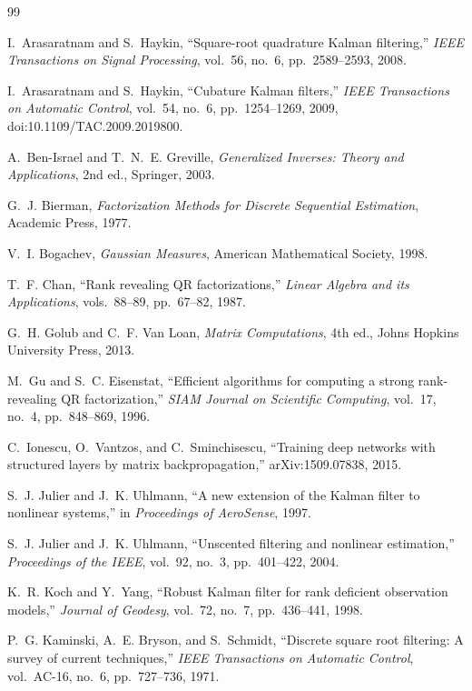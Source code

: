 \documentclass[11pt]{article}
\begin{document}
\begin{thebibliography}{99}

I.~Arasaratnam and S.~Haykin, ``Square-root quadrature Kalman filtering,''
\emph{IEEE Transactions on Signal Processing}, vol.~56, no.~6, pp.~2589--2593,
2008.

I.~Arasaratnam and S.~Haykin, ``Cubature Kalman filters,''
\emph{IEEE Transactions on Automatic Control}, vol.~54, no.~6, pp.~1254--1269,
2009, doi:10.1109/TAC.2009.2019800.

A.~Ben-Israel and T.~N.~E. Greville, \emph{Generalized Inverses: Theory and
Applications}, 2nd ed., Springer, 2003.

G.~J. Bierman, \emph{Factorization Methods for Discrete Sequential Estimation},
Academic Press, 1977.

V.~I. Bogachev, \emph{Gaussian Measures}, American Mathematical Society, 1998.

T.~F. Chan, ``Rank revealing QR factorizations,'' \emph{Linear Algebra and its
Applications}, vols.~88--89, pp.~67--82, 1987.

G.~H. Golub and C.~F. Van Loan, \emph{Matrix Computations}, 4th ed., Johns
Hopkins University Press, 2013.

M.~Gu and S.~C. Eisenstat, ``Efficient algorithms for computing a strong
rank-revealing QR factorization,'' \emph{SIAM Journal on Scientific Computing},
vol.~17, no.~4, pp.~848--869, 1996.

C.~Ionescu, O.~Vantzos, and C.~Sminchisescu, ``Training deep networks with
structured layers by matrix backpropagation,'' arXiv:1509.07838, 2015.

S.~J. Julier and J.~K. Uhlmann, ``A new extension of the Kalman filter to
nonlinear systems,'' in \emph{Proceedings of AeroSense}, 1997.

S.~J. Julier and J.~K. Uhlmann, ``Unscented filtering and nonlinear estimation,''
\emph{Proceedings of the IEEE}, vol.~92, no.~3, pp.~401--422, 2004.

K.~R. Koch and Y.~Yang, ``Robust Kalman filter for rank deficient observation
models,'' \emph{Journal of Geodesy}, vol.~72, no.~7, pp.~436--441, 1998.

P.~G. Kaminski, A.~E. Bryson, and S.~Schmidt, ``Discrete square root filtering:
A survey of current techniques,'' \emph{IEEE Transactions on Automatic Control},
vol.~AC-16, no.~6, pp.~727--736, 1971.


\end{thebibliography}
\end{document}
